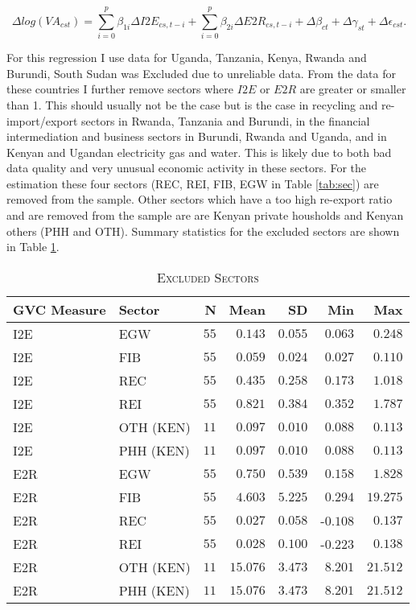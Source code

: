\documentclass[a4paper]{article}
\begin{document}
\begin{equation} \label{eq:GROWTH_HDFE}
\Delta log(VA_{cst}) = \sum_{i=0}^p \beta_{1i} \Delta I2E_{cs,t-i} + \sum_{i = 0}^p \beta_{2i} \Delta E2R_{cs,t-i}  + \Delta\beta_{ct} + \Delta\gamma_{st} + \Delta\epsilon_{cst}.
\end{equation}

For this regression I use data for Uganda, Tanzania, Kenya, Rwanda and Burundi, South Sudan was Excluded due to unreliable data. From the data for these countries I further remove sectors where $I2E$ or $E2R$ are greater or smaller than 1. This should usually not be the case but is the case in recycling and re-import/export sectors in Rwanda, Tanzania and Burundi, in the financial intermediation and business sectors in Burundi, Rwanda and Uganda, and in Kenyan and Ugandan electricity gas and water. This is likely due to both bad data quality and very unusual economic activity in these sectors. For the estimation these four sectors (REC, REI, FIB, EGW in Table \ref{tab:sec}) are removed from the sample. Other sectors which have a too high re-export ratio and are removed from the sample are are Kenyan private housholds and  Kenyan others (PHH and OTH). Summary statistics for the excluded sectors are shown in Table \ref{tab:EXCL_SEC}.

\begin{table}[h!] \centering 
  \caption{\label{tab:EXCL_SEC}\textsc{Excluded Sectors}}
  \vspace{2mm}
\begin{tabular}{ llrrrrr} \toprule
GVC Measure & Sector & N & Mean & SD & Min & Max \\ 
\midrule
I2E & EGW & $55$ & $0.143$ & $0.055$ & $0.063$ & $0.248$ \\ 
I2E & FIB & $55$ & $0.059$ & $0.024$ & $0.027$ & $0.110$ \\ 
I2E & REC & $55$ & $0.435$ & $0.258$ & $0.173$ & $1.018$ \\ 
I2E & REI & $55$ & $0.821$ & $0.384$ & $0.352$ & $1.787$ \\ 
I2E & OTH (KEN) & $11$ & $0.097$ & $0.010$ & $0.088$ & $0.113$ \\ 
I2E & PHH (KEN) & $11$ & $0.097$ & $0.010$ & $0.088$ & $0.113$ \\ 
E2R & EGW & $55$ & $0.750$ & $0.539$ & $0.158$ & $1.828$ \\ 
E2R & FIB & $55$ & $4.603$ & $5.225$ & $0.294$ & $19.275$ \\ 
E2R & REC & $55$ & $0.027$ & $0.058$ & -$0.108$ & $0.137$ \\ 
E2R & REI & $55$ & $0.028$ & $0.100$ & -$0.223$ & $0.138$ \\ 
E2R & OTH (KEN) & $11$ & $15.076$ & $3.473$ & $8.201$ & $21.512$ \\ 
E2R & PHH (KEN) & $11$ & $15.076$ & $3.473$ & $8.201$ & $21.512$ \\ 
\bottomrule
\end{tabular} 
\end{table} 
\end{document}
